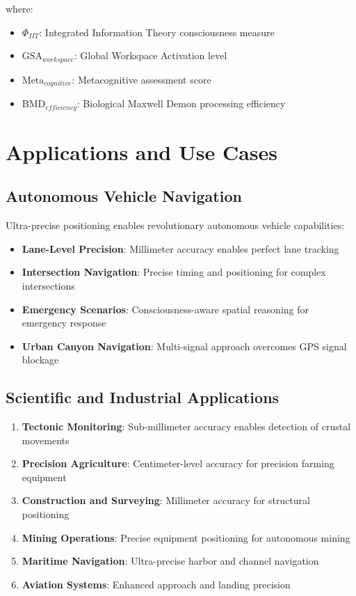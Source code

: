 \documentclass[12pt,a4paper]{article}
\begin{document}
where:
\begin{itemize}
\item $\Phi_{IIT}$: Integrated Information Theory consciousness measure
\item $\text{GSA}_{workspace}$: Global Workspace Activation level
\item $\text{Meta}_{cognitive}$: Metacognitive assessment score
\item $\text{BMD}_{efficiency}$: Biological Maxwell Demon processing efficiency
\end{itemize}

\section{Applications and Use Cases}

\subsection{Autonomous Vehicle Navigation}

Ultra-precise positioning enables revolutionary autonomous vehicle capabilities:

\begin{itemize}
\item \textbf{Lane-Level Precision}: Millimeter accuracy enables perfect lane tracking
\item \textbf{Intersection Navigation}: Precise timing and positioning for complex intersections
\item \textbf{Emergency Scenarios}: Consciousness-aware spatial reasoning for emergency response
\item \textbf{Urban Canyon Navigation}: Multi-signal approach overcomes GPS signal blockage
\end{itemize}

\subsection{Scientific and Industrial Applications}

\begin{enumerate}
\item \textbf{Tectonic Monitoring}: Sub-millimeter accuracy enables detection of crustal movements
\item \textbf{Precision Agriculture}: Centimeter-level accuracy for precision farming equipment
\item \textbf{Construction and Surveying}: Millimeter accuracy for structural positioning
\item \textbf{Mining Operations}: Precise equipment positioning for autonomous mining
\item \textbf{Maritime Navigation}: Ultra-precise harbor and channel navigation
\item \textbf{Aviation Systems}: Enhanced approach and landing precision
\end{enumerate}
\end{document}
